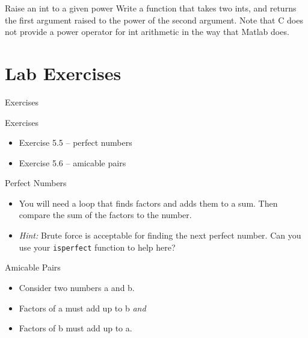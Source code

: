 \documentclass{beamer}
\begin{document}
\begin{frame}{Raise an int to a given power}
    Write a function that takes two ints, and returns the first argument
    raised to the power of the second argument. Note that C does not
    provide a power operator for int arithmetic in the way that Matlab does.
\end{frame}

\section{Lab Exercises}

\begin{frame}{Exercises}
    \begin{block}{Exercises}
        \begin{itemize}
            \item Exercise 5.5 -- perfect numbers
            \item Exercise 5.6 -- amicable pairs
        \end{itemize}
    \end{block}
\end{frame}

\begin{frame}{Perfect Numbers}
    \begin{itemize}
        \item You will need a loop that finds factors and adds them to a
            sum. Then compare the sum of the factors to the number.
        \item \emph{Hint:} Brute force is acceptable for finding the next
            perfect number. Can you use your \texttt{isperfect} function to
            help here?
    \end{itemize}
\end{frame}

\begin{frame}{Amicable Pairs}
    \begin{itemize}
        \item Consider two numbers a and b.
        \item Factors of a must add up to b \emph{and}
        \item Factors of b must add up to a.
    \end{itemize}
\end{frame}
\end{document}
